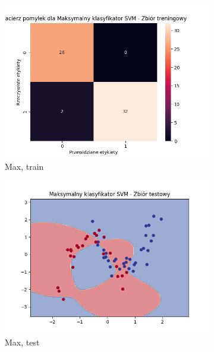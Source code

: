 \documentclass[12pt]{article}
\newcommand*{\subfigwidth}{0.24\textwidth}
\begin{document}
\begin{figure}[H]
\begin{subfigure}[t]{\subfigwidth}
        \includegraphics[width=\linewidth]{img/exp_3/svm/2_3/max/train_matrix.png}
        \caption{Max, train}
    \end{subfigure}
    \hfill
    \begin{subfigure}[t]{\subfigwidth}
        \includegraphics[width=\linewidth]{img/exp_3/svm/2_3/max/test_boundary.png}
        \caption{Max, test}
    \end{subfigure}
    \hfill
    \begin{subfigure}[t]{\subfigwidth}

\end{subfigure}
\end{figure}
\end{document}
